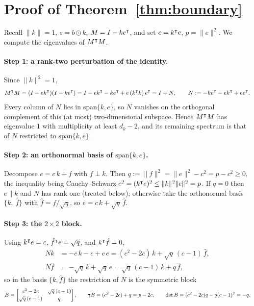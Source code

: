 \documentclass[11pt,letterpaper,logo]{yalearxiv}
\begin{document}
\appendix
\section{Proof of Theorem~\ref{thm:boundary}}
\label{app:proof}

Recall $\|k\|=1$, $e = b\odot k$, $M = I - k e^{\intercal}$, and set $c = k^{\intercal}e$,
$p = \|e\|^2$. We compute the eigenvalues of $M^{\intercal}M$.

\paragraph{Step 1: a rank-two perturbation of the identity.}
Since $\|k\|^2 = 1$,
\begin{equation*}
  M^{\intercal}M = (I - e k^{\intercal})(I - k e^{\intercal})
           = I - e k^{\intercal} - k e^{\intercal} + e\,(k^{\intercal}k)\,e^{\intercal}
           = I + N,
  \qquad
  N := -k e^{\intercal} - e k^{\intercal} + e e^{\intercal}.
\end{equation*}
Every column of $N$ lies in $\mathrm{span}\{k,e\}$, so $N$ vanishes on the orthogonal
complement of this (at most) two-dimensional subspace. Hence $M^{\intercal}M$ has eigenvalue
$1$ with multiplicity at least $d_k - 2$, and its remaining spectrum is that of $N$
restricted to $\mathrm{span}\{k,e\}$.

\paragraph{Step 2: an orthonormal basis of $\mathrm{span}\{k,e\}$.}
Decompose $e = c\,k + f$ with $f \perp k$. Then
$q := \|f\|^2 = \|e\|^2 - c^2 = p - c^2 \ge 0$, the inequality being Cauchy--Schwarz
$c^2 = (k^{\intercal}e)^2 \le \|k\|^2\|e\|^2 = p$. If $q = 0$ then $e \parallel k$ and $N$ has
rank one (treated below); otherwise take the orthonormal basis $\{k,\ \hat f\}$ with
$\hat f = f/\sqrt{q}$, so $e = c\,k + \sqrt{q}\,\hat f$.

\paragraph{Step 3: the $2\times2$ block.}
Using $k^{\intercal}e = c$, $\hat f^{\intercal}e = \sqrt q$, and $k^{\intercal}\hat f = 0$,
\begin{align*}
  N k       &= -c\,k - e + c\,e = (c^2 - 2c)\,k + \sqrt q\,(c-1)\,\hat f, \\
  N \hat f  &= -\sqrt q\,k + \sqrt q\,e = \sqrt q\,(c-1)\,k + q\,\hat f,
\end{align*}
so in the basis $\{k,\hat f\}$ the restriction of $N$ is the symmetric block
\begin{equation*}
  B = \begin{bmatrix} c^2 - 2c & \sqrt q\,(c-1)\\[2pt] \sqrt q\,(c-1) & q \end{bmatrix},
  \qquad
  \intercal B = (c^2 - 2c) + q = p - 2c,
  \qquad
  \det B = (c^2-2c)q - q(c-1)^2 = -q .
\end{equation*}
\end{document}
